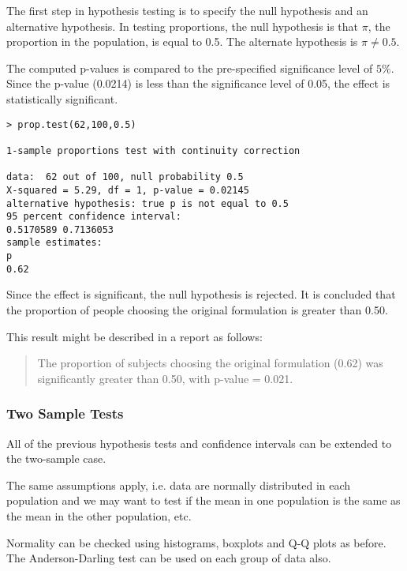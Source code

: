 The first step in hypothesis testing is to specify the null hypothesis and an alternative hypothesis. In testing proportions, the null hypothesis is that $\pi$, the proportion in the population, is equal to 0.5. The alternate hypothesis is $\pi \neq 0.5$. 

The computed p-values is compared to the pre-specified significance level of $5\%$. Since the p-value (0.0214) is less than the significance level of 0.05, the effect is statistically significant. 

\begin{verbatim}
> prop.test(62,100,0.5)

1-sample proportions test with continuity correction

data:  62 out of 100, null probability 0.5 
X-squared = 5.29, df = 1, p-value = 0.02145
alternative hypothesis: true p is not equal to 0.5 
95 percent confidence interval:
0.5170589 0.7136053 
sample estimates:
p 
0.62 
\end{verbatim}

Since the effect is significant, the null hypothesis is rejected. It is concluded that the proportion of people choosing the original formulation is greater than 0.50. 

This result might be described in a report as follows: 

\begin{quote}
	The proportion of subjects choosing the original formulation (0.62) was significantly greater than 0.50, with p-value = 0.021.
\end{quote}  



\subsubsection{Two Sample Tests}


All of the previous hypothesis tests and confidence intervals can be
extended to the two-sample case.

The same assumptions apply, i.e. data are normally distributed in
each population and we may want to test if the mean in one
population is the same as the mean in the other population, etc.

Normality can be checked using histograms, boxplots and Q-Q
plots as before. The Anderson-Darling test can be used on
each group of data also.



